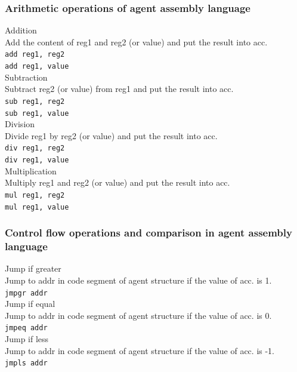 \documentclass{scrreprt}
\begin{document}
\subsubsection{Arithmetic operations of agent assembly language}
\noindent
Addition\\
\noindent
Add the content of reg1 and reg2 (or value) and put the result into acc.\\
\noindent
\texttt{add reg1, reg2}\\
\texttt{add reg1, value}\\


\noindent
Subtraction\\
\noindent
Subtract reg2 (or value) from reg1 and put the result into acc.\\
\noindent
\texttt{sub reg1, reg2}\\
\texttt{sub reg1, value}\\


\noindent
Division\\
\noindent
Divide reg1 by reg2 (or value) and put the result into acc.\\
\noindent
\texttt{div reg1, reg2}\\
\texttt{div reg1, value}\\


\noindent
Multiplication\\
\noindent
Multiply reg1 and reg2 (or value) and put the result into acc.\\
\noindent
\texttt{mul reg1, reg2}\\
\texttt{mul reg1, value}\\
\noindent

\subsubsection{Control flow operations and comparison in agent assembly language}
\noindent
Jump if greater\\
\noindent
Jump to addr in code segment of agent structure if the value of acc. is 1.\\
\noindent
\texttt{jmpgr  addr}\\


\noindent
Jump if equal\\
\noindent
Jump to addr in code segment of agent structure if the value of acc. is 0.\\
\noindent
\texttt{jmpeq  addr}\\


\noindent
Jump if less\\
\noindent
Jump to addr in code segment of agent structure if the value of acc. is -1.\\
\texttt{jmpls  addr}\\
\end{document}
